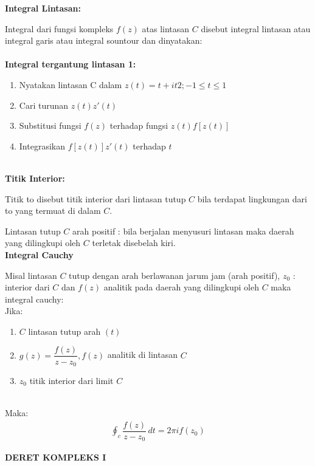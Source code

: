 \documentclass{article}
\begin{document}
\textbf{Integral Lintasan:}

Integral dari fungsi kompleks $f(z)$ atas lintasan $C$ disebut integral lintasan atau integral garis atau integral sountour dan dinyatakan:
\leavevmode\\ \\

\textbf{Integral tergantung lintasan 1:}
\begin{enumerate}
    \item Nyatakan lintasan C dalam $z(t) =t +it2 ; -1 \leq t \leq 1$
    \item Cari turunan $z(t) z'(t)$
    \item Substitusi fungsi $f(z)$ terhadap fungsi $z (t)  f[z(t)]$
    \item Integrasikan  $f[z(t)] z'(t)$ terhadap $t$
\end{enumerate}
\leavevmode\\

\textbf{Titik Interior:}

Titik to disebut titik interior dari lintasan tutup $C$ bila terdapat lingkungan dari to yang termuat di dalam $C$.

Lintasan tutup $C$ arah positif : bila berjalan menyusuri lintasan maka daerah yang dilingkupi oleh $C$ terletak disebelah kiri.
\leavevmode\\

\newpage
\textbf{Integral Cauchy}

Misal lintasan $C$ tutup dengan arah berlawanan jarum jam (arah positif),  $z_0$ : interior dari $C$ dan $f(z)$ analitik pada daerah yang dilingkupi oleh $C$ maka integral cauchy:
\leavevmode\\

Jika:
\begin{enumerate}
    \item $C$ lintasan tutup arah $(t)$
    \item $g(z) = \dfrac{f(z)}{z-z_0} , f(z)$ analitik di lintasan $C$
    \item $z_0$ titik interior dari limit $C$
\end{enumerate}
\leavevmode\\

Maka:
\begin{align}
    \oint_{c}^{} \dfrac{f(z)}{z-z_0} \,dt = 2\pi i f(z_0)
    \nonumber
\end{align}



\newpage
\begin{center}
    \textbf{DERET KOMPLEKS I}
\end{center}
\leavevmode\\
\end{document}
